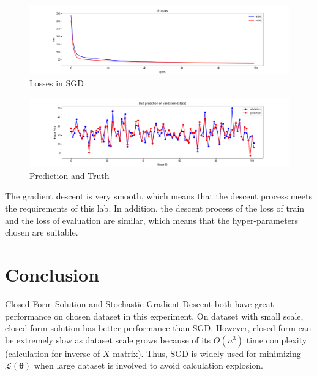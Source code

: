 \documentclass[journal, a4paper]{IEEEtran}
\begin{document}
    \begin{figure}[!hbt]
        \begin{center}
        \caption{Losses in SGD}
        \label{fig:sgd-losses}
        \includegraphics[width=\columnwidth]{../images/sgd-losses.png}
        \end{center}
    \end{figure}
    
    \begin{figure}[!hbt]
        \begin{center}
        \caption{Prediction and Truth}
        \label{fig:sgd-prediction}
        \includegraphics[width=\columnwidth]{../images/sgd-prediction.png}
        \end{center}
    \end{figure}

    The gradient descent is very smooth, which means that the descent process meets the requirements of this lab. In addition, the descent process of the loss of train and the loss of evaluation are similar, which means that the hyper-parameters chosen are suitable.

\section{Conclusion}
	Closed-Form Solution and Stochastic Gradient Descent both have great performance on chosen dataset in this experiment. On dataset with small scale, closed-form solution has better performance than SGD. However, closed-form can be extremely slow as dataset scale grows because of its $O(n^3)$ time complexity (calculation for inverse of $X$ matrix). Thus, SGD is widely used for minimizing $\mathcal{L}(\boldsymbol\theta)$ when large dataset is involved to avoid calculation explosion.


\end{document}
